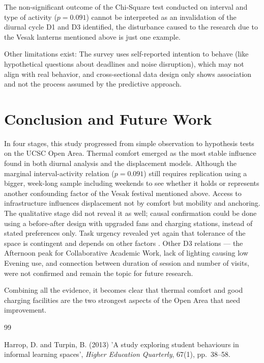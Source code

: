 \documentclass[12pt, a4paper]{report}
\begin{document}
The non-significant outcome of the Chi-Square test conducted on interval and type of activity ($p = 0.091$) cannot be interpreted as an invalidation of the diurnal cycle D1 and D3 identified, the disturbance caused to the research due to the Vesak lanterns mentioned above is just one example.

Other limitations exist: The survey uses self-reported intention to behave (like hypothetical questions about deadlines and noise disruption), which may not align with real behavior, and cross-sectional data design only shows association and not the process assumed by the predictive approach.

\chapter{Conclusion and Future Work}

In four stages, this study progressed from simple observation to hypothesis tests on the UCSC Open Area. Thermal comfort emerged as the most stable influence found in both diurnal analysis and the displacement models. Although the marginal interval-activity relation ($p = 0.091$) still requires replication using a bigger, week-long sample including weekends to see whether it holds or represents another confounding factor of the Vesak festival mentioned above. Access to infrastructure influences displacement not by comfort but mobility and anchoring. The qualitative stage did not reveal it as well; causal confirmation could be done using a before-after design with upgraded fans and charging stations, instead of stated preferences only. Task urgency revealed yet again that tolerance of the space is contingent and depends on other factors \citep{harrop2013}. Other D3 relations --- the Afternoon peak for Collaborative Academic Work, lack of lighting causing low Evening use, and connection between duration of session and number of visits,  were not confirmed and remain the topic for future research.

Combining all the evidence, it becomes clear that thermal comfort and good charging facilities are the two strongest aspects of the Open Area that need improvement.



\renewcommand{\bibname}{References}
\begin{thebibliography}{99}

 Harrop, D. and Turpin, B. (2013) 'A study exploring student behaviours in informal learning spaces', \textit{Higher Education Quarterly}, 67(1), pp.~38--58.

\end{thebibliography}


\printindex
\end{document}
